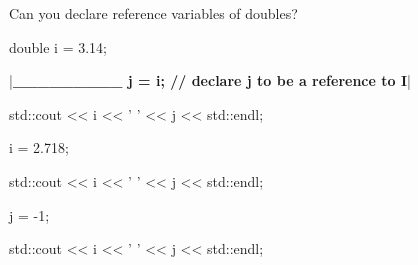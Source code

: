 Can you declare reference variables of doubles?



\begin{consolethree}[escapeinside=||]

double i = 3.14;

|\textbf{\_\_\_\_\_\_\_\_\_ j = i; // declare j to be a reference to I}|

std::cout << i << ' ' << j << std::endl;

i = 2.718;

std::cout << i << ' ' << j << std::endl;

j = -1;

std::cout << i << ' ' << j << std::endl;

\end{consolethree}

